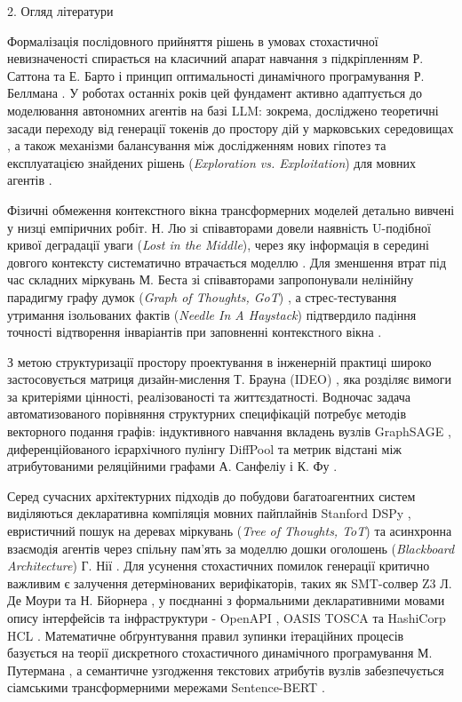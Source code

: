 \documentclass[12pt, reqno, a4paper]{amsart}
\theoremstyle{definition}
\theoremstyle{plain}
\theoremstyle{plain}
\theoremstyle{plain}
\theoremstyle{remark}
\theoremstyle{plain}
\begin{document}
{\begin{Head}
2. Огляд літератури
\end{Head}

Формалізація послідовного прийняття рішень в умовах стохастичної невизначеності спирається на класичний апарат навчання з підкріпленням Р. Саттона та Е. Барто \cite{bib5} і принцип оптимальності динамічного програмування Р. Беллмана \cite{bib6}. У роботах останніх років цей фундамент активно адаптується до моделювання автономних агентів на базі LLM: зокрема, досліджено теоретичні засади переходу від генерації токенів до простору дій у марковських середовищах \cite{bib7}, а також механізми балансування між дослідженням нових гіпотез та експлуатацією знайдених рішень (\textit{Exploration vs. Exploitation}) для мовних агентів \cite{bib8}.

Фізичні обмеження контекстного вікна трансформерних моделей детально вивчені у низці емпіричних робіт. Н. Лю зі співавторами довели наявність U-подібної кривої деградації уваги (\textit{Lost in the Middle}), через яку інформація в середині довгого контексту систематично втрачається моделлю \cite{bib9}. Для зменшення втрат під час складних міркувань М. Беста зі співавторами запропонували нелінійну парадигму графу думок (\textit{Graph of Thoughts, GoT}) \cite{bib10}, а стрес-тестування утримання ізольованих фактів (\textit{Needle In A Haystack}) підтвердило падіння точності відтворення інваріантів при заповненні контекстного вікна \cite{bib11}.

З метою структуризації простору проектування в інженерній практиці широко застосовується матриця дизайн-мислення Т. Брауна (IDEO) \cite{bib12}, яка розділяє вимоги за критеріями цінності, реалізованості та життєздатності. Водночас задача автоматизованого порівняння структурних специфікацій потребує методів векторного подання графів: індуктивного навчання вкладень вузлів GraphSAGE \cite{bib13}, диференційованого ієрархічного пулінгу DiffPool \cite{bib14} та метрик відстані між атрибутованими реляційними графами А. Санфеліу і К. Фу \cite{bib15}.

Серед сучасних архітектурних підходів до побудови багатоагентних систем виділяються декларативна компіляція мовних пайплайнів Stanford DSPy \cite{bib16}, евристичний пошук на деревах міркувань (\textit{Tree of Thoughts, ToT}) \cite{bib17} та асинхронна взаємодія агентів через спільну пам'ять за моделлю дошки оголошень (\textit{Blackboard Architecture}) Г. Нії \cite{bib18}. Для усунення стохастичних помилок генерації критично важливим є залучення детермінованих верифікаторів, таких як SMT-солвер Z3 Л. Де Моури та Н. Бйорнера \cite{bib19}, у поєднанні з формальними декларативними мовами опису інтерфейсів та інфраструктури - OpenAPI \cite{bib20}, OASIS TOSCA \cite{bib21} та HashiCorp HCL \cite{bib22}. Математичне обґрунтування правил зупинки ітераційних процесів базується на теорії дискретного стохастичного динамічного програмування М. Путермана \cite{bib23}, а семантичне узгодження текстових атрибутів вузлів забезпечується сіамськими трансформерними мережами Sentence-BERT \cite{bib24}.

}
\end{document}
